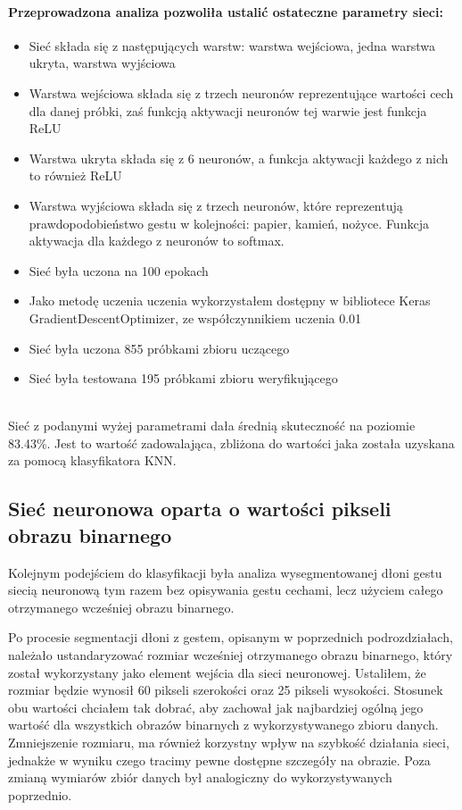\documentclass[a4paper,12pt,twoside,openany]{report}
\begin{document}
	\paragraph{Przeprowadzona analiza pozwoliła ustalić ostateczne parametry sieci:}
	\begin{itemize}
		\item Sieć składa się z następujących warstw: warstwa wejściowa, jedna warstwa ukryta, warstwa wyjściowa
		\item Warstwa wejściowa składa się z trzech neuronów reprezentujące wartości cech dla danej próbki, zaś funkcją aktywacji neuronów tej warwie jest funkcja ReLU
		\item Warstwa ukryta składa się z 6 neuronów, a funkcja aktywacji każdego z nich to również ReLU
		\item Warstwa wyjściowa składa się z trzech neuronów, które reprezentują prawdopodobieństwo gestu w kolejności: papier, kamień, nożyce. Funkcja aktywacja dla każdego z neuronów to softmax.
		\item Sieć była uczona na 100 epokach
		\item Jako metodę uczenia uczenia wykorzystałem dostępny w bibliotece Keras GradientDescentOptimizer, ze współczynnikiem uczenia 0.01
		\item Sieć była uczona 855 próbkami zbioru uczącego
		\item Sieć była testowana 195 próbkami zbioru weryfikującego
	\end{itemize}
	\mbox{}
	\\
	Sieć z podanymi wyżej parametrami dała średnią skuteczność na poziomie 83.43\%. Jest to wartość zadowalająca, zbliżona do wartości jaka została uzyskana za pomocą klasyfikatora KNN.
\subsection{Sieć neuronowa oparta o wartości pikseli obrazu binarnego}


	Kolejnym podejściem do klasyfikacji była analiza wysegmentowanej dłoni gestu siecią neuronową tym razem bez opisywania gestu cechami, lecz użyciem całego otrzymanego wcześniej obrazu binarnego.
	
	Po procesie segmentacji dłoni z gestem, opisanym w poprzednich podrozdziałach, należało ustandaryzować rozmiar wcześniej otrzymanego obrazu binarnego, który został wykorzystany jako element wejścia dla sieci neuronowej. Ustaliłem, że rozmiar będzie wynosił 60 pikseli szerokości oraz 25 pikseli wysokości. Stosunek obu wartości chciałem tak dobrać, aby zachował jak najbardziej ogólną jego wartość dla wszystkich obrazów binarnych z wykorzystywanego zbioru danych. Zmniejszenie rozmiaru, ma również korzystny wpływ na szybkość działania sieci, jednakże w wyniku czego tracimy pewne dostępne szczegóły na obrazie. Poza zmianą wymiarów zbiór danych był analogiczny do wykorzystywanych poprzednio.
\end{document}
